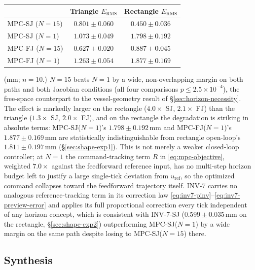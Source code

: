 \documentclass[journal]{IEEEtran}
\begin{document}
\begin{center}
\begin{tabular}{@{}lcc@{}}
\toprule
& Triangle $E_{\mathrm{RMS}}$ & Rectangle $E_{\mathrm{RMS}}$ \\
\midrule
MPC-SJ ($N{=}15$) & $0.801\pm0.060$ & $0.450\pm0.036$ \\
MPC-SJ ($N{=}1$) & $1.073\pm0.049$ & $1.798\pm0.192$ \\
\midrule
MPC-FJ ($N{=}15$) & $0.627\pm0.020$ & $0.887\pm0.045$ \\
MPC-FJ ($N{=}1$) & $1.263\pm0.054$ & $1.877\pm0.169$ \\
\bottomrule
\end{tabular}
\end{center}
(mm; $n=10$.) $N{=}15$ beats $N{=}1$ by a wide, non-overlapping margin
on both paths and both Jacobian conditions (all four comparisons
$p\le2.5\times10^{-4}$), the free-space counterpart to the vessel-geometry
result of \S\ref{sec:horizon-necessity}. The effect is markedly larger on
the rectangle ($4.0\times$ SJ, $2.1\times$ FJ) than the triangle
($1.3\times$ SJ, $2.0\times$ FJ), and on the rectangle the degradation is
striking in absolute terms: MPC-SJ($N{=}1$)'s $1.798\pm0.192$\,mm and
MPC-FJ($N{=}1$)'s $1.877\pm0.169$\,mm are statistically indistinguishable
from rectangle open-loop's $1.811\pm0.197$\,mm (\S\ref{sec:shape-exp1}).
This is not merely a weaker closed-loop controller; at $N{=}1$ the
command-tracking term $R$ in \eqref{eq:mpc-objective}, weighted
$7.0\times$ against the feedforward reference input, has no multi-step
horizon budget left to justify a large single-tick deviation from
$u_{\mathrm{ref}}$, so the optimized command collapses toward the
feedforward trajectory itself. INV-7 carries no analogous
reference-tracking term in its correction law
\eqref{eq:inv7-pinv}--\eqref{eq:inv7-preview-error} and applies its full
proportional correction every tick independent of any horizon concept,
which is consistent with INV-7-SJ ($0.599\pm0.035$\,mm on the rectangle,
\S\ref{sec:shape-exp2}) outperforming MPC-SJ($N{=}1$) by a wide margin on
the same path despite losing to MPC-SJ($N{=}15$) there.

\subsection{Synthesis}
\label{sec:shape-synthesis}
\end{document}
